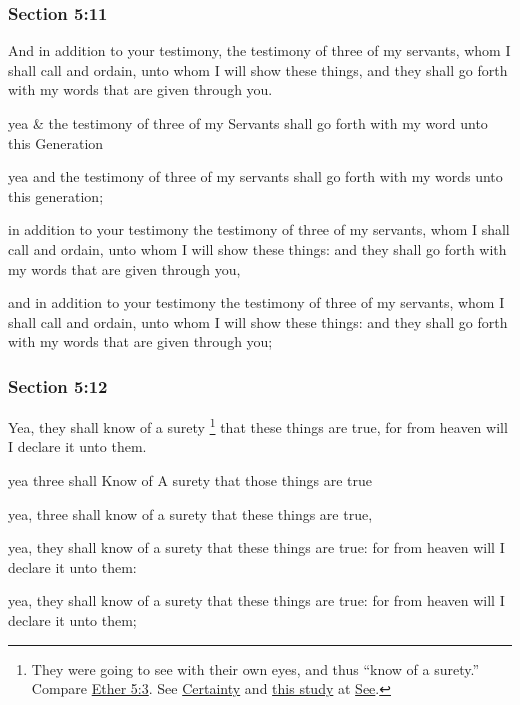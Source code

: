 	\subsubsection{Section 5:11} %
		\label{DC5-11}

		And in addition to your testimony, the testimony of three of my servants, whom I shall call and ordain, unto whom I will show these things, and they shall go forth with my words that are given through you.

		\begin{framed}
		\scriptsize
			\begin{compactdesc}
				\item[JSP] yea \& the testimony of three of my Servants shall go forth with my word unto this Generation
				\item[RB1] [\textit{missing}]
				\item[BC] yea and the testimony of three of my servants shall go forth with my words unto this generation; 
				\item[DC 1835] in addition to your testimony the testimony of three of my servants, whom I shall call and ordain, unto whom I will show these things: and they shall go forth with my words that are given through you,
				\item[DC 1844] and in addition to your testimony the testimony of three of my servants, whom I shall call and ordain, unto whom I will show these things: and they shall go forth with my words that are given through you;
			\end{compactdesc}
		\end{framed}

	\subsubsection{Section 5:12} %
		\label{DC5-12}

		Yea, they shall know of a surety%
			\footnote{%
				They were going to see with their own eyes, and thus ``know of a surety.'' Compare \hyperref[ETHER-5-3]{Ether 5:3}. See \hyperref[CERTAINTY]{Certainty} and \hyperref[SEE-epistemic]{this study} at \hyperref[SEE]{See}.
				}
		that these things are true, for from heaven will I declare it unto them.

		\begin{framed}
		\scriptsize
			\begin{compactdesc}
				\item[JSP] yea three shall Know of A surety that those things are true
				\item[RB1] [\textit{missing}]
				\item[BC] yea, three shall know of a surety that these things are true,
				\item[DC 1835] yea, they shall know of a surety that these things are true: for from heaven will I declare it unto them:
				\item[DC 1844] yea, they shall know of a surety that these things are true: for from heaven will I declare it unto them;
			\end{compactdesc}
		\end{framed}

